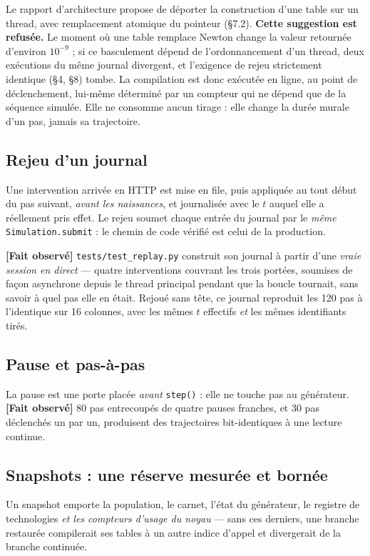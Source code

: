 \documentclass[11pt,a4paper]{article}
\newcommand{\code}[1]{\texttt{#1}}
\newcommand{\fait}{\textbf{[Fait observé]}}
\begin{document}
Le rapport d'architecture propose de déporter la construction d'une table
sur un thread, avec remplacement atomique du pointeur (§7.2). \textbf{Cette
suggestion est refusée.} Le moment où une table remplace Newton change la
valeur retournée d'environ $10^{-9}$ ; si ce basculement dépend de
l'ordonnancement d'un thread, deux exécutions du même journal divergent, et
l'exigence de rejeu strictement identique (§4, §8) tombe. La compilation
est donc exécutée en ligne, au point de déclenchement, lui-même déterminé
par un compteur qui ne dépend que de la séquence simulée. Elle ne consomme
aucun tirage : elle change la durée murale d'un pas, jamais sa trajectoire.

\subsection{Rejeu d'un journal}

Une intervention arrivée en HTTP est mise en file, puis appliquée au tout
début du pas suivant, \emph{avant les naissances}, et journalisée avec le
$t$ auquel elle a réellement pris effet. Le rejeu soumet chaque entrée du
journal par le \emph{même} \code{Simulation.submit} : le chemin de code
vérifié est celui de la production.

\fait{} \code{tests/test\_replay.py} construit son journal à partir d'une
\emph{vraie session en direct} --- quatre interventions couvrant les trois
portées, soumises de façon asynchrone depuis le thread principal pendant
que la boucle tournait, sans savoir à quel pas elle en était. Rejoué sans
tête, ce journal reproduit les 120 pas à l'identique sur 16 colonnes, avec
les mêmes $t$ effectifs \emph{et} les mêmes identifiants tirés.

\subsection{Pause et pas-à-pas}

La pause est une porte placée \emph{avant} \code{step()} : elle ne touche
pas au générateur. \fait{} 80 pas entrecoupés de quatre pauses franches, et
30 pas déclenchés un par un, produisent des trajectoires bit-identiques à
une lecture continue.

\subsection{Snapshots : une réserve mesurée et bornée}
\label{sec:snapshot}

Un snapshot emporte la population, le carnet, l'état du générateur, le
registre de technologies \emph{et les compteurs d'usage du noyau} --- sans
ces derniers, une branche restaurée compilerait ses tables à un autre
indice d'appel et divergerait de la branche continuée.
\end{document}

